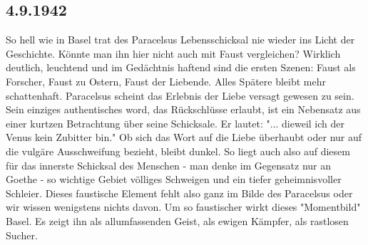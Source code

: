 \subsection{4.9.1942}

So hell wie in Basel trat des Paracelsus Lebensschicksal nie wieder ins Licht der Geschichte.
K\"{o}nnte man ihn hier nicht auch mit Faust vergleichen?
Wirklich deutlich, leuchtend und im Ged\"{a}chtnis haftend sind die ersten Szenen: Faust als Forscher, Faust zu Ostern, Faust der Liebende.
Alles Sp\"{a}tere bleibt mehr schattenhaft.
Paracelsus scheint das Erlebnis der Liebe versagt gewesen zu sein.
Sein einziges authentisches word, das R\"{u}ckschl\"{u}sse erlaubt, ist ein Nebensatz aus einer kurtzen Betrachtung \"{u}ber seine Schicksale.
Er lautet: "... dieweil ich der Venus kein Zubitter bin."
Ob sich das Wort auf die Liebe \"{u}berhaubt oder nur auf die vulg\"{a}re Ausschweifung bezieht, bleibt dunkel.
So liegt auch also auf diesem f\"{u}r das innerste Schicksal des Menschen - man denke im Gegensatz nur an Goethe - so wichtige Gebiet v\"{o}lliges Schweigen und ein tiefer geheimnisvoller Schleier.
Dieses faustische Element fehlt also ganz im Bilde des Paracelsus oder wir wissen wenigstens nichts davon.
Um so faustischer wirkt dieses "Momentbild" Basel.
Es zeigt ihn als allumfassenden Geist, als ewigen K\"{a}mpfer, als rastlosen Sucher.

\clearpage
